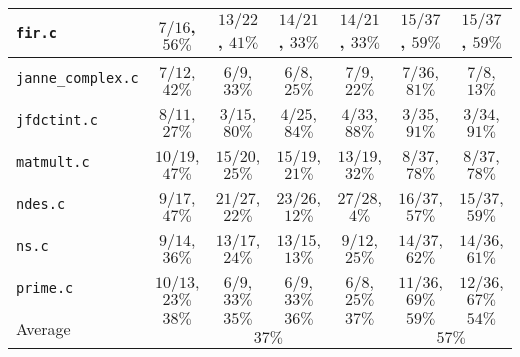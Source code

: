 \begin{tabular}{ |l| |c|c|c|c| |c|c| }
  \\\hline
  \verb|fir.c|
  & $7/16$, $56\%$ & $13/22$, $41\%$ & $14/21$, $33\%$  & $14/21$, $33\%$
  & $15/37$, $59\%$ & $15/37$, $59\%$

  \\\hline
  \verb|janne_complex.c|
  & $7/12$, $42\%$ & $6/9$,\hspace{.5em} $33\%$ & $6/8$,\hspace{.5em} $25\%$ & $7/9$,\hspace{.5em} $22\%$
  & $7/36$, $81\%$ & $7/8$,\hspace{.5em} $13\%$

  \\\hline
  \verb|jfdctint.c|
  & $8/11$, $27\%$ & $3/15$, $80\%$ & $4/25$, $84\%$ & $4/33$, $88\%$
  & $3/35$, $91\%$ & $3/34$, $91\%$
  
  \\\hline
  \verb|matmult.c|
  & $10/19$, $47\%$ & $15/20$, $25\%$ & $15/19$, $21\%$ & $13/19$, $32\%$
  & $8/37$, $78\%$ & $8/37$, $78\%$

  \\\hline
  \verb|ndes.c|
  & $9/17$, $47\%$ & $21/27$, $22\%$  & $23/26$, $12\%$ & $27/28$,\hspace{.5em} $4\%$
  & $16/37$, $57\%$ & $15/37$, $59\%$

  \\\hline
  \verb|ns.c|
  & $9/14$, $36\%$ & $13/17$, $24\%$ & $13/15$, $13\%$ & $9/12$, $25\%$ 
  & $14/37$, $62\%$ & $14/36$, $61\%$

  \\\hline
  \verb|prime.c|
  & $10/13$, $23\%$ & $6/9$,\hspace{.5em} $33\%$ & $6/9$,\hspace{.5em} $33\%$ & $6/8$,\hspace{.5em} $25\%$
  & $11/36$, $69\%$ & $12/36$, $67\%$

  \\\hline\hline
  \multirow{2}{*}{Average}
  & \multicolumn{1}{c|}{$38\%$} & \multicolumn{1}{c|}{$35\%$} & \multicolumn{1}{c|}{$36\%$} & \multicolumn{1}{c||}{$37\%$}
  & \multicolumn{1}{c|}{$59\%$} & \multicolumn{1}{c|}{$54\%$}

  \\\cline{2-7}  
  & \multicolumn{4}{c||}{$37\%$}
  & \multicolumn{2}{c|}{$57\%$}
    
  \\\hline
\end{tabular}
